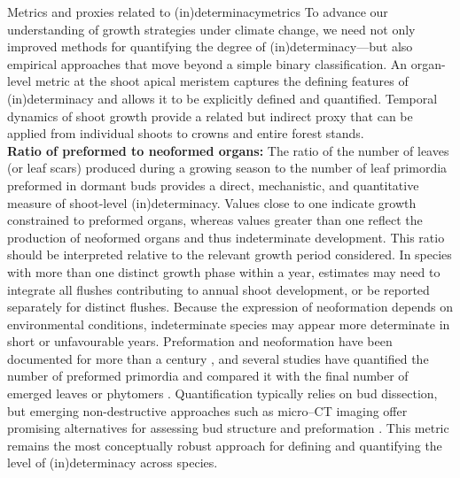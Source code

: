 \documentclass{article}
\begin{document}
	
	
	\newpage
	
	
	
	


		\begin{metricsbox}{Metrics and proxies related to (in)determinacy}{metrics}
		\small
			To advance our understanding of growth strategies under climate change, we need not only improved methods for quantifying the degree of (in)determinacy—but also empirical approaches that move beyond a simple binary classification. An organ-level metric at the shoot apical meristem captures the defining features of (in)determinacy and allows it to be explicitly defined and quantified. Temporal dynamics of shoot growth provide a related but indirect proxy that can be applied from individual shoots to crowns and entire forest stands.\\
		
		
				\textbf{Ratio of preformed to neoformed organs:} 
	The ratio of the number of leaves (or leaf scars) produced during a growing season to the number of leaf primordia preformed in dormant buds provides a direct, mechanistic, and quantitative measure of shoot-level (in)determinacy. Values close to one indicate growth constrained to preformed organs, whereas values greater than one reflect the production of neoformed organs and thus indeterminate development. This ratio should be interpreted relative to the relevant growth period considered. In species with more than one distinct growth phase within a year, estimates may need to integrate all flushes contributing to annual shoot development, or be reported separately for distinct flushes. Because the expression of neoformation depends on environmental conditions, indeterminate species may appear more determinate in short or unfavourable years. Preformation and neoformation have been documented for more than a century \citep{mooreStudyWinterBuds1909}, and several studies have quantified the number of preformed primordia and compared it with the final number of emerged leaves or phytomers \citep{damascosBudCompositionBranching2005, kikuzawaLeafSurvivalWoody1983, guedonRelativeExtentsPreformation2006}. Quantification typically relies on bud dissection, but emerging non-destructive approaches such as micro–CT imaging offer promising alternatives for assessing bud structure and preformation \citep{kovaleskiXrayPhaseContrast2019}. This metric remains the most conceptually robust approach for defining and quantifying the level of (in)determinacy across species.\\
		

\end{metricsbox}
\end{document}
